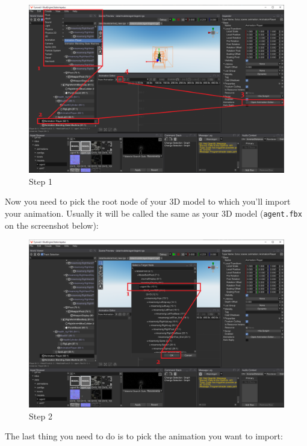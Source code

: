 \documentclass[
]{book}
\theoremstyle{definition}
\theoremstyle{definition}
\theoremstyle{definition}
\theoremstyle{definition}
\theoremstyle{remark}
\begin{document}
\begin{figure}
\centering
\includegraphics{images/animation/import_animation_1.png}
\caption{Step 1}
\end{figure}

Now you need to pick the root node of your 3D model to which you'll import your animation. Usually it will be called the same as your 3D model (\texttt{agent.fbx} on the screenshot below):

\begin{figure}
\centering
\includegraphics{images/animation/import_animation_2.png}
\caption{Step 2}
\end{figure}

The last thing you need to do is to pick the animation you want to import:
\end{document}
